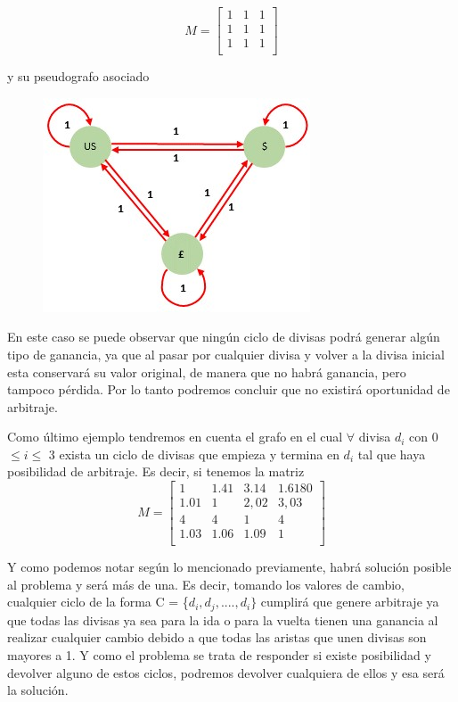 \documentclass[11pt,a4paper]{article}
\begin{document}
\[
M=
  \begin{bmatrix}
    1 & 1 & 1 \\
    1 & 1 & 1 \\
    1 & 1 & 1 \\
  \end{bmatrix}
\]

y su pseudografo asociado
\begin{figure}[h]
    \centering
    \includegraphics{Grafoejemplo1.jpg}
\end{figure}


En este caso se puede observar que ning\'un ciclo de divisas podr\'a generar alg\'un tipo de ganancia, ya que al pasar por cualquier divisa y volver a la divisa inicial esta conservar\'a su valor original, de manera que no habr\'a ganancia, pero tampoco p\'erdida. Por lo tanto podremos concluir que  no existir\'a oportunidad de arbitraje.
\\


Como \'ultimo ejemplo tendremos en cuenta el grafo en el cual $\forall$ divisa $d_{i}$ con 0 $\leq i \leq$ 3 exista un ciclo de divisas que empieza y termina en $d_{i}$ tal que haya posibilidad de arbitraje. Es decir, si tenemos la matriz
\[
M=
  \begin{bmatrix}
    1 & 1.41 & 3.14 & 1.6180 \\
    1.01 & 1 & 2,02 & 3,03 \\
    4 & 4 & 1 & 4 \\
    1.03 & 1.06 & 1.09 & 1 \\
  \end{bmatrix}
\]


Y como podemos notar seg\'un lo mencionado previamente, habr\'a  soluci\'on posible al problema y ser\'a m\'as de una. Es decir, tomando los valores de cambio, cualquier ciclo de la forma C = \{$d_{i}, d_{j},....,d_{i} \}$ cumplir\'a que genere arbitraje ya que todas las divisas ya sea para la ida o para la vuelta tienen una ganancia al realizar cualquier cambio debido a que todas las aristas que unen divisas son mayores a 1. Y como el problema se trata de responder si existe posibilidad y devolver alguno de estos ciclos, podremos devolver cualquiera de ellos y esa ser\'a la soluci\'on.
\pagebreak
\end{document}
